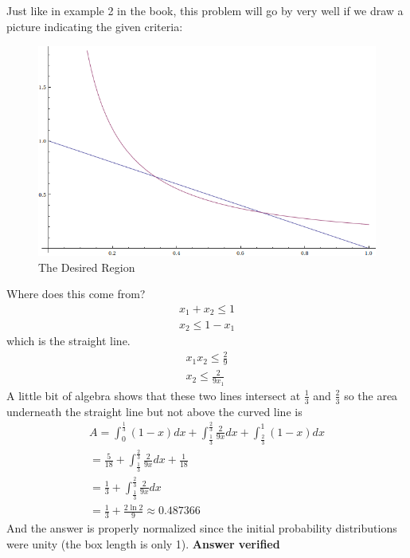 \subsection{}
Just like in example 2 in the book, this problem will go by very well if we draw a picture indicating the given criteria:

\begin{figure}[hbtp]
\includegraphics[width=\textwidth]{overlap.png}
\caption{The Desired Region}
\end{figure}
Where does this come from?
\begin{eqnarray}
	x_1 + x_2 \leq 1 \\ 
	x_2 \leq 1 - x_1
\end{eqnarray}
which is the straight line.
\begin{eqnarray}
	x_1x_2 \leq \frac{2}{9} \\ 
	x_2 \leq \frac{2}{9 x_1}
\end{eqnarray}
A little bit of algebra shows that these two lines intersect at $\frac{1}{3}$ and $\frac{2}{3}$ so the area underneath the straight line but not above the curved line is
\begin{eqnarray}
	A =\int_0^{\frac{1}{3}}(1-x)dx + \int_{\frac{1}{3}}^{\frac{2}{3}}\frac{2}{9x}dx + \int_{\frac{2}{3}}^{1}(1-x)dx \\ 
	= \frac{5}{18} + \int_{\frac{1}{3}}^{\frac{2}{3}}\frac{2}{9x}dx + \frac{1}{18} \\
	= \frac{1}{3} + \int_{\frac{1}{3}}^{\frac{2}{3}}\frac{2}{9x}dx \\ 
	= \frac{1}{3	} + \frac{2 \ln 2}{9} \approx 0.487366
\end{eqnarray}
And the answer is properly normalized since the initial probability distributions were unity (the box length is only 1).
\textbf{Answer  verified}


